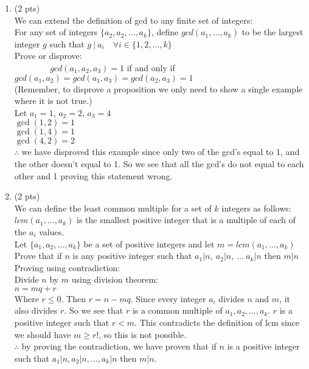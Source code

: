 \documentclass[12pt]{article}
\begin{document}
\begin{enumerate}
\item (2 pts) \\
We can extend the definition of gcd to any finite set of integers:
\leavevmode\\\relax
For any set of integers \(\lbrace a_2,a_2,\dots,a_k \rbrace\), define \(gcd(a_1,\dots,a_k)\) to be the largest integer \(g\) such that \(g~|~a_i \quad  \forall i \in \lbrace 1,2,\dots,k \rbrace\)
\leavevmode\\\relax
Prove or disprove:
\leavevmode\\\relax
\(\hspace{50pt} gcd(a_1,a_2,a_3)=1\)  if and only if \(gcd(a_1,a_2) = gcd(a_1,a_3) = gcd(a_2,a_3) = 1\)
\leavevmode\\\relax
(Remember, to disprove a proposition we only need to show a single example where it is not true.)
\\Let $a_{1}=1$, $a_{2}=2$, $a_{3}=4$
\\$\gcd(1,2) = 1$
\\$\gcd(1,4) = 1$
\\$\gcd(4,2) = 2$
\\$\therefore$ we have disproved this example since only two of the gcd's equal to 1, and the other doesn't equal to 1. So we see that all the gcd's do not equal to each other and 1 proving this statement wrong.

\item (2 pts) \\
We can define the least common multiple for a set of $k$ integers as follows:
\leavevmode\\\relax
\(lcm(a_1,\dots,a_k)\) is the smallest positive integer that is a multiple of each of the \(a_i\) values. \\
Let \(\lbrace a_1,a_2,\dots,a_k \rbrace\) be a set of positive integers and let \(m=lcm(a_1, \dots, a_k)\) \\
Prove that if \(n\) is any positive integer such that \(a_1|n, ~ a_2|n, ~ \dots ~ a_k|n\) then \(m|n\)
\\Proving using contradiction:
\\Divide $n$ by $m$ using division theorem:
\\$n = mq + r$
\\Where $r \leq 0$. Then $r = n - mq$. Since every integer $a_i$ divides $n$ and $m$, it also divides $r$. So we see that $r$ is a common multiple of $a_1,a_2,...,a_k$. $r$ is a positive integer such that $r<m$. This contradicts the definition of lcm since we should have $m \geq r!$, so this is not possible.
\\$\therefore$ by proving the contradiction, we have proven that if $n$ is a positive integer such that $a_1|n,a_2|n,...,a_k|n$ then $m|n$.


\end{enumerate}
\end{document}

